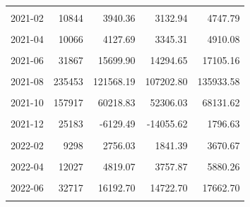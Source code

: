 \begin{longtable}[t]{crrrr}
\cellcolor{gray!10}{2021-01} & \cellcolor{gray!10}{13695} & \cellcolor{gray!10}{3266.16} & \cellcolor{gray!10}{1158.01} & \cellcolor{gray!10}{5374.32}\\
2021-02 & 10844 & 3940.36 & 3132.94 & 4747.79\\
\cellcolor{gray!10}{2021-03} & \cellcolor{gray!10}{12371} & \cellcolor{gray!10}{7285.26} & \cellcolor{gray!10}{5593.09} & \cellcolor{gray!10}{8977.43}\\
2021-04 & 10066 & 4127.69 & 3345.31 & 4910.08\\
\cellcolor{gray!10}{2021-05} & \cellcolor{gray!10}{22973} & \cellcolor{gray!10}{10950.83} & \cellcolor{gray!10}{9608.14} & \cellcolor{gray!10}{12293.52}\\
2021-06 & 31867 & 15699.90 & 14294.65 & 17105.16\\
\cellcolor{gray!10}{2021-07} & \cellcolor{gray!10}{70829} & \cellcolor{gray!10}{25781.38} & \cellcolor{gray!10}{24426.31} & \cellcolor{gray!10}{27136.46}\\
2021-08 & 235453 & 121568.19 & 107202.80 & 135933.58\\
\cellcolor{gray!10}{2021-09} & \cellcolor{gray!10}{263437} & \cellcolor{gray!10}{126852.43} & \cellcolor{gray!10}{109879.15} & \cellcolor{gray!10}{143825.70}\\
2021-10 & 157917 & 60218.83 & 52306.03 & 68131.62\\
\cellcolor{gray!10}{2021-11} & \cellcolor{gray!10}{59927} & \cellcolor{gray!10}{12286.22} & \cellcolor{gray!10}{3761.62} & \cellcolor{gray!10}{20810.82}\\
2021-12 & 25183 & -6129.49 & -14055.62 & 1796.63\\
\cellcolor{gray!10}{2022-01} & \cellcolor{gray!10}{15952} & \cellcolor{gray!10}{4626.95} & \cellcolor{gray!10}{2776.68} & \cellcolor{gray!10}{6477.23}\\
2022-02 & 9298 & 2756.03 & 1841.39 & 3670.67\\
\cellcolor{gray!10}{2022-03} & \cellcolor{gray!10}{6866} & \cellcolor{gray!10}{748.86} & \cellcolor{gray!10}{-1772.46} & \cellcolor{gray!10}{3270.18}\\
2022-04 & 12027 & 4819.07 & 3757.87 & 5880.26\\
\cellcolor{gray!10}{2022-05} & \cellcolor{gray!10}{26615} & \cellcolor{gray!10}{12810.41} & \cellcolor{gray!10}{10961.55} & \cellcolor{gray!10}{14659.27}\\
2022-06 & 32717 & 16192.70 & 14722.70 & 17662.70\\
\cellcolor{gray!10}{2022-07} & \cellcolor{gray!10}{43692} & \cellcolor{gray!10}{18305.59} & \cellcolor{gray!10}{16987.11} & \cellcolor{gray!10}{19624.07}\\

\end{longtable}
